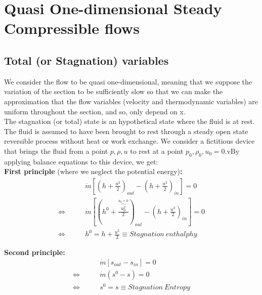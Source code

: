 

\chapter{Quasi One-dimensional Steady Compressible flows}

\section{Total (or Stagnation) variables}

We consider the flow to be quasi one-dimensional, meaning that we suppose the variation of the section to be sufficiently slow so that we can make the approximation that the flow variables (velocity and thermodynamic variables) are uniform throughout the section, and so, only depend on x.
\\

The stagnation (or total) state is an hypothetical state where the fluid is at rest. The fluid is assumed to have been brought to rest through a steady open state reversible process without heat or work exchange. We consider a fictitious device that brings the fluid from a point $p, \rho,u$ to rest at a point $p_0, \rho_0, u_0=0$.vBy applying balance equations to this device, we get:
\\

\textbf{First principle} (where we neglect the potential energy)\textbf{:}
\begin{equation}
\begin{aligned}
&\dot{m}[(h+\frac{u^2}{2})_{out}-(h+\frac{u^2}{2})_{in}]=0 \\
\Leftrightarrow \qquad&\dot{m}[(h^0+\frac{\overbrace{u_0^2}^{u_0=0}}{2})_{out}-(h+\frac{u^2}{2})_{in}]=0 \\
\Leftrightarrow \qquad &h^0=h+\frac{u^2}{2} \equiv Stagnation \ enthalphy
\end{aligned}
\end{equation}

\textbf{Second principle:} 
\begin{equation}
\begin{aligned}
&\dot{m} [s_{out}-s_{in}]=0 \\
\Leftrightarrow \qquad &\dot{m} (s^{0}-s)=0 \\
\Leftrightarrow \qquad &s^{0}=s \equiv Stagnation \ Entropy
\end{aligned}
\end{equation}

